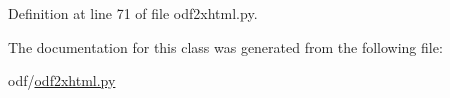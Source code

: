 Definition at line 71 of file odf2xhtml.\+py.



The documentation for this class was generated from the following file\+:\begin{DoxyCompactItemize}
\item 
odf/\hyperlink{odf2xhtml_8py}{odf2xhtml.\+py}\end{DoxyCompactItemize}
